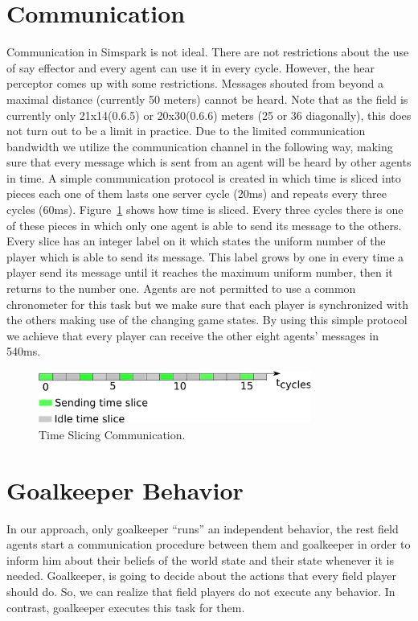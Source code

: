 \section{Communication}
Communication in Simspark is not ideal. There are not restrictions about the use of say effector and every agent can use it in every cycle. However, the hear perceptor comes up with some restrictions. Messages shouted from beyond a maximal distance (currently 50 meters) cannot be heard. Note that as the field is currently only 21x14(0.6.5) or 20x30(0.6.6) meters (25 or 36 diagonally), this does not turn out to be a limit in practice. Due to the limited communication bandwidth we utilize the communication channel in the following way, making sure that every message which is sent from an agent will be heard by other agents in time. A simple communication protocol is created in which time is sliced into pieces each one of them lasts one server cycle (20ms) and repeats every three cycles (60ms). Figure~\ref{fig:TimeSlicing} shows how time is sliced. Every three cycles there is one of these pieces in which only one agent is able to send its message to the others. Every slice has an integer label on it which states the uniform number of the player which is able to send its message. This label grows by one in every time a player send its message until it reaches the maximum uniform number, then it returns to the number one. Agents are not permitted to use a common chronometer for this task but we make sure that each player is synchronized with the others making use of the changing game states. By using this simple protocol we achieve that every player can receive the other eight agents' messages in 540ms.

\begin{figure}[t!]
\centering
  \includegraphics[width=0.8\textwidth]{Chapter3/figures/MAC.pdf}  
  \caption{Time Slicing Communication.}
  \label{fig:TimeSlicing}
\end{figure} 


\section{Goalkeeper Behavior}

In our approach, only goalkeeper ``runs'' an independent behavior, the rest field agents start a communication procedure between them and goalkeeper in order to inform him about their beliefs of the world state and their state whenever it is needed. Goalkeeper, is going to decide about the actions that every field player should do. So, we can realize that field players do not execute any behavior. In contrast, goalkeeper executes this task for them.


